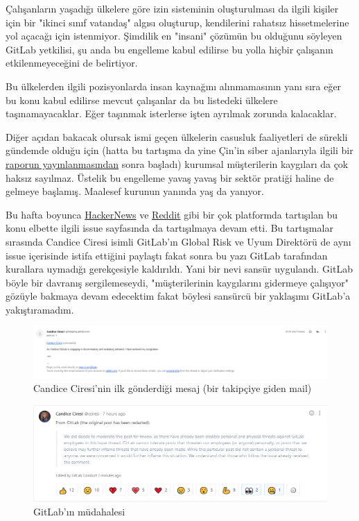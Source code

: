 \documentclass[11pt]{article}
\begin{document}
Çalışanların yaşadığı ülkelere göre izin sisteminin oluşturulması da ilgili
kişiler için bir "ikinci sınıf vatandaş" algısı oluşturup, kendilerini rahatsız
hissetmelerine yol açacağı için istenmiyor. Şimdilik en "insani" çözümün bu
olduğunu söyleyen GitLab yetkilisi, şu anda bu engelleme kabul edilirse bu
yolla hiçbir çalışanın etkilenmeyeceğini de belirtiyor.

Bu ülkelerden ilgili pozisyonlarda insan kaynağını alınmamasının yanı sıra eğer
bu konu kabul edilirse mevcut çalışanlar da bu listedeki ülkelere
taşınamayacaklar. Eğer taşınmak isterlerse işten ayrılmak zorunda kalacaklar.

Diğer açıdan bakacak olursak ismi geçen ülkelerin casusluk faaliyetleri de
sürekli gündemde olduğu için (hatta bu tartışma da yine Çin'in siber
ajanlarıyla ilgili bir \href{https://www.zdnet.com/article/building-chinas-comac-c919-airplane-involved-a-lot-of-hacking-report-says/}{raporun yayınlanmasından} sonra başladı) kurumsal
müşterilerin kaygıları da çok haksız sayılmaz. Üstelik bu engelleme yavaş yavaş
bir sektör pratiği haline de gelmeye başlamış. Maalesef kurunun yanında yaş da
yanıyor.

Bu hafta boyunca \href{https://news.ycombinator.com/item?id=21437334}{HackerNews} ve \href{https://www.reddit.com/r/gitlab/comments/dtfccm/gitlabs\_director\_of\_risk\_and\_global\_compliance/}{Reddit} gibi bir çok platformda tartışılan bu
konu elbette ilgili issue sayfasında da tartışılmaya devam etti. Bu tartışmalar
sırasında Candice Ciresi isimli GitLab'ın Global Risk ve Uyum Direktörü de aynı
issue içerisinde istifa ettiğini paylaştı fakat sonra bu yazı GitLab tarafından
kurallara uymadığı gerekçesiyle kaldırıldı. Yani bir nevi sansür uygulandı.
GitLab böyle bir davranış sergilemeseydi, "müşterilerinin kaygılarını gidermeye
çalışıyor" gözüyle bakmaya devam edecektim fakat böylesi sansürcü bir yaklaşımı
GitLab'a yakıştıramadım.

\begin{figure}[htbp]
\centering
\includegraphics[width=.9\linewidth]{gorseller/gitlab-istifa-1.png}
\caption{Candice Ciresi'nin ilk gönderdiği mesaj (bir takipçiye giden mail)}
\end{figure}

\begin{figure}[htbp]
\centering
\includegraphics[width=.9\linewidth]{gorseller/gitlab-istifa-2.png}
\caption{GitLab'ın müdahalesi}
\end{figure}
\end{document}
